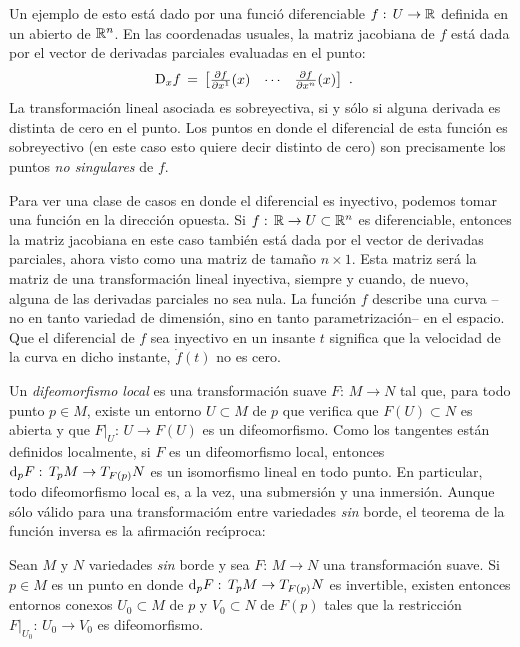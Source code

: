 Un ejemplo de esto est\'{a} dado por una funci\'{o} diferenciable
$f:\,U\rightarrow\bb{R}$ definida en un abierto de $\bb{R}^{n}$. En las
coordenadas usuales, la matriz jacobiana de $f$ est\'{a} dada por el
vector de derivadas parciales evaluadas en el punto:
\begin{align*}
	\jacobiana[x]{f} & \,=\,
		\begin{bmatrix}
			\derivada{f}{x^{1}}(x) & \cdots &
			\derivada{f}{x^{n}}(x)
		\end{bmatrix}
	\text{ .}
\end{align*}
%
La transformaci\'{o}n lineal asociada es sobreyectiva, si y s\'{o}lo si
alguna derivada es distinta de cero en el punto. Los puntos en donde el
diferencial de esta funci\'{o}n es sobreyectivo (en este caso esto quiere
decir distinto de cero) son precisamente los puntos \emph{no singulares}
de $f$.

Para ver una clase de casos en donde el diferencial es inyectivo, podemos
tomar una funci\'{o}n en la direcci\'{o}n opuesta. Si
$f:\,\bb{R}\rightarrow U\subset\bb{R}^{n}$ es diferenciable, entonces la
matriz jacobiana en este caso tambi\'{e}n est\'{a} dada por el vector de
derivadas parciales, ahora visto como una matriz de tama\~{n}o
$n\times 1$. Esta matriz ser\'{a} la matriz de una transformaci\'{o}n
lineal inyectiva, siempre y cuando, de nuevo, alguna de las derivadas
parciales no sea nula. La funci\'{o}n $f$ describe una curva --no en
tanto variedad de dimensi\'{o}n, sino en tanto parametrizaci\'{o}n--
en el espacio. Que el diferencial de $f$ sea inyectivo en un insante $t$
significa que la velocidad de la curva en dicho instante, $\dot{f}(t)$ no
es cero.

Un \emph{difeomorfismo local} es una transformaci\'{o}n suave
$F:\,M\rightarrow N$ tal que, para todo punto $p\in M$, existe un entorno
$U\subset M$ de $p$ que verifica que $F(U)\subset N$ es abierta y que
$F|_{U}:\,U\rightarrow F(U)$ es un difeomorfismo. Como los tangentes
est\'{a}n definidos localmente, si $F$ es un difeomorfismo local, entonces
$\diferencial[p]{F}:\,T_{p}M\rightarrow T_{F(p)}N$ es un isomorfismo
lineal en todo punto. En particular, todo difeomorfismo local es, a la
vez, una submersi\'{o}n y una inmersi\'{o}n. Aunque s\'{o}lo v\'{a}lido
para una transformaci\'{o}m entre variedades \emph{sin} borde, el teorema
de la funci\'{o}n inversa es la afirmaci\'{o}n rec\'{\i}proca:

\begin{teoFunInvVar}\label{thm:funinvvar}
	Sean $M$ y $N$ variedades \emph{sin} borde y sea $F:\,M\rightarrow N$
	una transformaci\'{o}n suave. Si $p\in M$ es un punto en donde
	$\diferencial[p]{F}:\,T_{p}M\rightarrow T_{F(p)}N$ es invertible,
	existen entonces entornos conexos $U_{0}\subset M$ de $p$ y
	$V_{0}\subset N$ de $F(p)$ tales que la restricci\'{o}n
	$F|_{U_{0}}:\,U_{0}\rightarrow V_{0}$ es difeomorfismo.
\end{teoFunInvVar}

